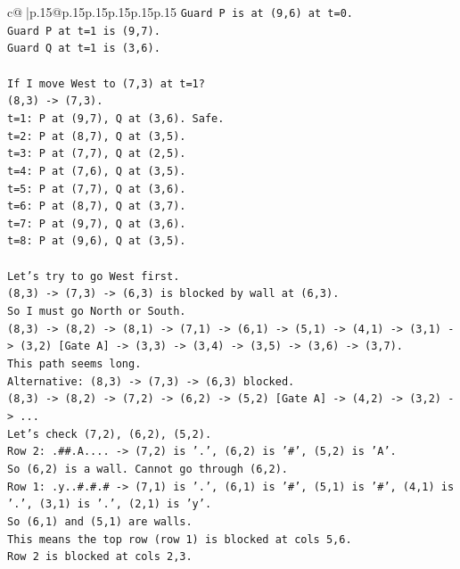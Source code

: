 \documentclass{article}
\begin{document}
{\begin{supertabular}{c@{$\;$}|p{.15\linewidth}@{}p{.15\linewidth}p{.15\linewidth}p{.15\linewidth}p{.15\linewidth}p{.15\linewidth}}
{{{\texttt{Guard P is at (9,6) at t=0.} \\
\texttt{Guard P at t=1 is (9,7).} \\
\texttt{Guard Q at t=1 is (3,6).} \\
\\ 
\texttt{If I move West to (7,3) at t=1?} \\
\texttt{(8,3) {-}> (7,3).} \\
\texttt{t=1: P at (9,7), Q at (3,6). Safe.} \\
\texttt{t=2: P at (8,7), Q at (3,5).} \\
\texttt{t=3: P at (7,7), Q at (2,5).} \\
\texttt{t=4: P at (7,6), Q at (3,5).} \\
\texttt{t=5: P at (7,7), Q at (3,6).} \\
\texttt{t=6: P at (8,7), Q at (3,7).} \\
\texttt{t=7: P at (9,7), Q at (3,6).} \\
\texttt{t=8: P at (9,6), Q at (3,5).} \\
\\ 
\texttt{Let's try to go West first.} \\
\texttt{(8,3) {-}> (7,3) {-}> (6,3) is blocked by wall at (6,3).} \\
\texttt{So I must go North or South.} \\
\texttt{(8,3) {-}> (8,2) {-}> (8,1) {-}> (7,1) {-}> (6,1) {-}> (5,1) {-}> (4,1) {-}> (3,1) {-}> (3,2) {[}Gate A{]} {-}> (3,3) {-}> (3,4) {-}> (3,5) {-}> (3,6) {-}> (3,7).} \\
\texttt{This path seems long.} \\
\texttt{Alternative: (8,3) {-}> (7,3) {-}> (6,3) blocked.} \\
\texttt{(8,3) {-}> (8,2) {-}> (7,2) {-}> (6,2) {-}> (5,2) {[}Gate A{]} {-}> (4,2) {-}> (3,2) {-}> ...} \\
\texttt{Let's check (7,2), (6,2), (5,2).} \\
\texttt{Row 2: .\#\#.A.... {-}> (7,2) is '.', (6,2) is '\#', (5,2) is 'A'.} \\
\texttt{So (6,2) is a wall. Cannot go through (6,2).} \\
\texttt{Row 1: .y..\#.\#.\# {-}> (7,1) is '.', (6,1) is '\#', (5,1) is '\#', (4,1) is '.', (3,1) is '.', (2,1) is 'y'.} \\
\texttt{So (6,1) and (5,1) are walls.} \\
\texttt{This means the top row (row 1) is blocked at cols 5,6.} \\
\texttt{Row 2 is blocked at cols 2,3.} \\
}}}
\end{supertabular}}
\end{document}
